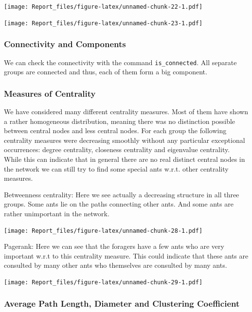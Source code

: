 \documentclass[
]{article}
\begin{document}
\texttt{[image: Report\_files/figure-latex/unnamed-chunk-22-1.pdf]}

\texttt{[image: Report\_files/figure-latex/unnamed-chunk-23-1.pdf]}

\hypertarget{connectivity-and-components}{%
\subsubsection{Connectivity and
Components}\label{connectivity-and-components}}

We can check the connectivity with the command \texttt{is\_connected}.
All separate groups are connected and thus, each of them form a big
component.

\hypertarget{measures-of-centrality-1}{%
\subsubsection{Measures of Centrality}\label{measures-of-centrality-1}}

We have considered many different centrality measures. Most of them have
shown a rather homogeneous distribution, meaning there was no
distinction possible between central nodes and less central nodes. For
each group the following centrality measures were decreasing smoothly
without any particular exceptional occurrences: degree centrality,
closeness centrality and eigenvalue centrality. While this can indicate
that in general there are no real distinct central nodes in the network
we can still try to find some special ants w.r.t. other centrality
measures.

Betweenness centrality: Here we see actually a decreasing structure in
all three groups. Some ants lie on the paths connecting other ants. And
some ants are rather unimportant in the network.

\texttt{[image: Report\_files/figure-latex/unnamed-chunk-28-1.pdf]}

Pagerank: Here we can see that the foragers have a few ants who are very
important w.r.t to this centrality measure. This could indicate that
these ants are consulted by many other ants who themselves are consulted
by many ants.

\texttt{[image: Report\_files/figure-latex/unnamed-chunk-29-1.pdf]}

\hypertarget{average-path-length-diameter-and-clustering-coefficient-1}{%
\subsubsection{Average Path Length, Diameter and Clustering
Coefficient}\label{average-path-length-diameter-and-clustering-coefficient-1}}
\end{document}
